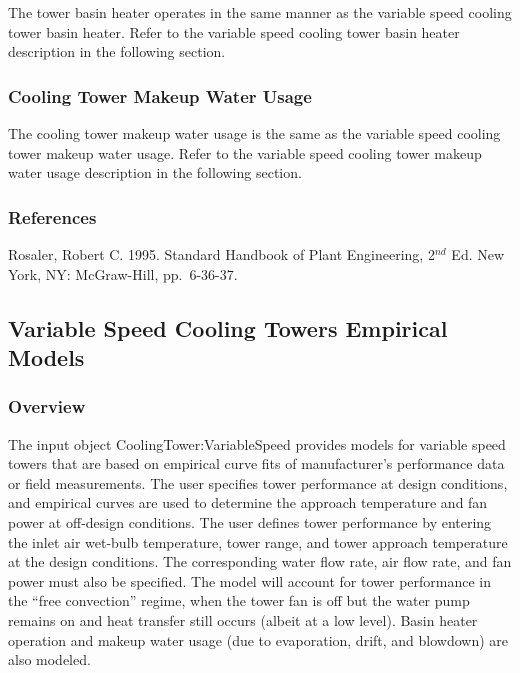 The tower basin heater operates in the same manner as the variable speed cooling tower basin heater. Refer to the variable speed cooling tower basin heater description in the following section.

\subsubsection{Cooling Tower Makeup Water Usage}\label{cooling-tower-makeup-water-usage}

The cooling tower makeup water usage is the same as the variable speed cooling tower makeup water usage. Refer to the variable speed cooling tower makeup water usage description in the following section.

\subsubsection{References}\label{references-015}

Rosaler, Robert C. 1995. Standard Handbook of Plant Engineering, 2\(^{nd}\) Ed. New York, NY: McGraw-Hill, pp.~6-36-37.

\subsection{Variable Speed Cooling Towers Empirical Models}\label{variable-speed-cooling-towers-empirical-models}

\subsubsection{Overview}\label{overview-1-005}

The input object CoolingTower:VariableSpeed provides models for variable speed towers that are based on empirical curve fits of manufacturer's performance data or field measurements. The user specifies tower performance at design conditions, and empirical curves are used to determine the approach temperature and fan power at off-design conditions. The user defines tower performance by entering the inlet air wet-bulb temperature, tower range, and tower approach temperature at the design conditions. The corresponding water flow rate, air flow rate, and fan power must also be specified. The model will account for tower performance in the ``free convection'' regime, when the tower fan is off but the water pump remains on and heat transfer still occurs (albeit at a low level). Basin heater operation and makeup water usage (due to evaporation, drift, and blowdown) are also modeled.

